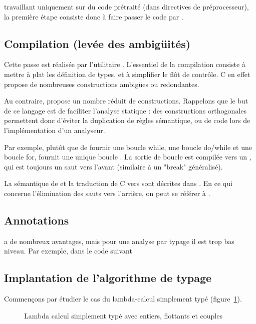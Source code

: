 \ctonewspeak{} travaillant uniquement sur du code prétraité (dans directives de
préprocesseur), la première étape consiste donc à faire passer le code par \cpp.

\subsection{Compilation (levée des ambigüités)}

Cette passe est réalisée par l'utilitaire \ctonewspeak{}. L'essentiel de la
compilation consiste à mettre à plat les définition de types, et à simplifier le
flôt de contrôle. C en effet propose de nombreuses constructions ambigües ou
redondantes.

Au contraire, \newspeak{} propose un nombre réduit de constructions. Rappelons
que le but de ce langage est de faciliter l'analyse statique : des constructions
orthogonales permettent donc d'éviter la duplication de règles sémantique, ou de
code lors de l'implémentation d'un analyseur.

Par exemple, plutôt que de fournir une boucle while, une boucle do/while et une
boucle for, \newspeak{} fournit une unique boucle \npkWhile{}. La sortie de
boucle est compilée vers un \npkGoto{}, qui est toujours un saut vers l'avant
(similaire à un "break" généralisé).

La sémantique de \newspeak{} et la traduction de C vers \newspeak{} sont
décrites dans \cite{newspeak}. En ce qui concerne l'élimination des sauts vers
l'arrière, on peut se référer à \cite{goto}.

\subsection{Annotations}

\newspeak{} a de nombreux avantages, mais pour une analyse par typage il est
trop bas niveau. Par exemple, dans le code suivant



\subsection{Implantation de l'algorithme de typage}

Commençons par étudier le cas du lambda-calcul simplement typé
(figure~\ref{fig:stlc}).

\begin{figure}



\caption{Lambda calcul simplement typé avec entiers, flottants et couples}
\label{fig:stlc}

\end{figure}

